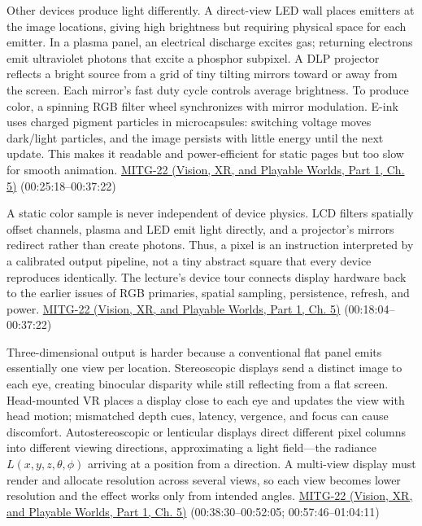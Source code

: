 Other devices produce light differently. A direct-view LED wall places emitters at the image locations, giving high brightness but requiring physical space for each emitter. In a plasma panel, an electrical discharge excites gas; returning electrons emit ultraviolet photons that excite a phosphor subpixel. A DLP projector reflects a bright source from a grid of tiny tilting mirrors toward or away from the screen. Each mirror's fast duty cycle controls average brightness. To produce color, a spinning RGB filter wheel synchronizes with mirror modulation. E-ink uses charged pigment particles in microcapsules: switching voltage moves dark/light particles, and the image persists with little energy until the next update. This makes it readable and power-efficient for static pages but too slow for smooth animation. \href{../07-Vision-XR-and-Playable-Worlds-P01/main.pdf\#nameddest=04-visual-computing-ii-ch036-mitg-22---output-devices}{MITG-22 (Vision, XR, and Playable Worlds, Part 1, Ch. 5)} (00:25:18--00:37:22)

A static color sample is never independent of device physics. LCD filters spatially offset channels, plasma and LED emit light directly, and a projector's mirrors redirect rather than create photons. Thus, a pixel is an instruction interpreted by a calibrated output pipeline, not a tiny abstract square that every device reproduces identically. The lecture's device tour connects display hardware back to the earlier issues of RGB primaries, spatial sampling, persistence, refresh, and power. \href{../07-Vision-XR-and-Playable-Worlds-P01/main.pdf\#nameddest=04-visual-computing-ii-ch036-mitg-22---output-devices}{MITG-22 (Vision, XR, and Playable Worlds, Part 1, Ch. 5)} (00:18:04--00:37:22)

Three-dimensional output is harder because a conventional flat panel emits essentially one view per location. Stereoscopic displays send a distinct image to each eye, creating binocular disparity while still reflecting from a flat screen. Head-mounted VR places a display close to each eye and updates the view with head motion; mismatched depth cues, latency, vergence, and focus can cause discomfort. Autostereoscopic or lenticular displays direct different pixel columns into different viewing directions, approximating a light field---the radiance \(L(x,y,z,\theta,\phi)\) arriving at a position from a direction. A multi-view display must render and allocate resolution across several views, so each view becomes lower resolution and the effect works only from intended angles. \href{../07-Vision-XR-and-Playable-Worlds-P01/main.pdf\#nameddest=04-visual-computing-ii-ch036-mitg-22---output-devices}{MITG-22 (Vision, XR, and Playable Worlds, Part 1, Ch. 5)} (00:38:30--00:52:05; 00:57:46--01:04:11)

